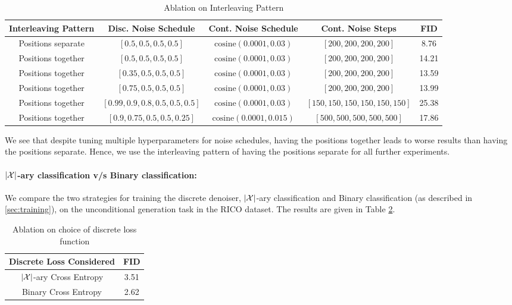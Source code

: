 \begin{table}[h]
    \centering
    \begin{tabular}{c c c c c}
    \toprule
   Interleaving Pattern & Disc. Noise Schedule & Cont. Noise Schedule & Cont. Noise Steps & FID \\
   \midrule
   Positions separate  &  $[0.5, 0.5, 0.5, 0.5]$ & $\text{cosine}(0.0001, 0.03)$ & $[200, 200, 200, 200]$ & 8.76 \\
   Positions together &  $[0.5, 0.5, 0.5, 0.5]$ & $\text{cosine}(0.0001, 0.03)$ & $[200, 200, 200, 200]$ & 14.21 \\
   Positions together &  $[0.35, 0.5, 0.5, 0.5]$ & $\text{cosine}(0.0001, 0.03)$ & $[200, 200, 200, 200]$ & 13.59 \\
   Positions together &  $[0.75, 0.5, 0.5, 0.5]$ & $\text{cosine}(0.0001, 0.03)$ & $[200, 200, 200, 200]$ & 13.99 \\
   Positions together &  $[0.99, 0.9, 0.8, 0.5, 0.5, 0.5]$ & $\text{cosine}(0.0001, 0.03)$ & $[150, 150, 150, 150, 150, 150]$ & 25.38 \\
   Positions together &  $[0.9, 0.75, 0.5, 0.5, 0.25]$ & $\text{cosine}(0.0001, 0.015)$ & $[500, 500, 500, 500, 500]$ & 17.86 \\
   \bottomrule
\end{tabular}
    \caption{Ablation on Interleaving Pattern}
    \label{tab:abl_layout_interleaving}
\end{table}

We see that despite tuning multiple hyperparameters for noise schedules, having the positions together leads to worse results than having the positions separate. Hence, we use the interleaving pattern of having the positions separate for all further experiments.

\paragraph{$\abs{\mathcal{X}}$-ary classification v/s Binary classification:} \label{app:par_xary_binary}
We compare the two strategies for training the discrete denoiser, $\abs{\mathcal{X}}$-ary classification and Binary classification (as described in \ref{sec:training}), on the unconditional generation task in the RICO dataset. The results are given in Table \ref{tab:abl_layout_loss}.

\begin{table}[h]
    \centering
    \begin{tabular}{c c}
    \toprule
   Discrete Loss Considered & FID \\
   \midrule
    $\abs{\mathcal{X}}$-ary Cross Entropy &  3.51 \\
   Binary Cross Entropy  & 2.62 \\
   \bottomrule
\end{tabular}
    \caption{Ablation on choice of discrete loss function}
    \label{tab:abl_layout_loss}
\end{table}


